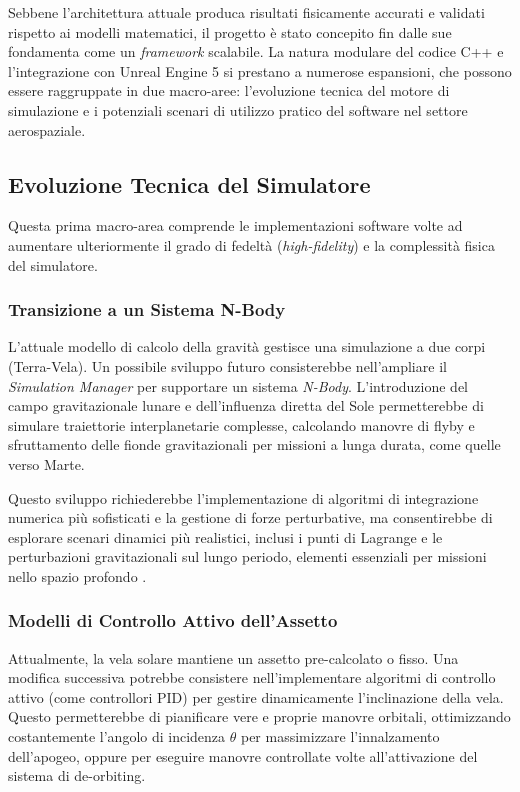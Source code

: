 Sebbene l'architettura attuale produca risultati fisicamente accurati e validati rispetto ai modelli matematici, il progetto è stato concepito fin dalle sue fondamenta come un \textit{framework} scalabile. La natura modulare del codice C++ e l'integrazione con Unreal Engine 5 si prestano a numerose espansioni, che possono essere raggruppate in due macro-aree: l'evoluzione tecnica del motore di simulazione e i potenziali scenari di utilizzo pratico del software nel settore aerospaziale.


\subsection{Evoluzione Tecnica del Simulatore}
Questa prima macro-area comprende le implementazioni software volte ad aumentare ulteriormente il grado di fedeltà (\textit{high-fidelity}) e la complessità fisica del simulatore.

\subsubsection{Transizione a un Sistema N-Body}
L'attuale modello di calcolo della gravità gestisce una simulazione a due corpi (Terra-Vela). Un possibile sviluppo futuro consisterebbe nell'ampliare il \textit{Simulation Manager} per supportare un sistema \textit{N-Body}. L'introduzione del campo gravitazionale lunare e dell'influenza diretta del Sole permetterebbe di simulare traiettorie interplanetarie complesse, calcolando manovre di flyby e sfruttamento delle fionde gravitazionali per missioni a lunga durata, come quelle verso Marte.

Questo sviluppo richiederebbe l'implementazione di algoritmi di integrazione numerica più sofisticati e la gestione di forze perturbative, ma consentirebbe di esplorare scenari dinamici più realistici, inclusi i punti di Lagrange e le perturbazioni gravitazionali sul lungo periodo, elementi essenziali per missioni nello spazio profondo \cite{johnson2008overview, montgomery2017roadmap}.

\subsubsection{Modelli di Controllo Attivo dell'Assetto}
Attualmente, la vela solare mantiene un assetto pre-calcolato o fisso. Una modifica successiva potrebbe consistere nell'implementare algoritmi di controllo attivo (come controllori PID) per gestire dinamicamente l'inclinazione della vela. Questo permetterebbe di pianificare vere e proprie manovre orbitali, ottimizzando costantemente l'angolo di incidenza $\theta$ per massimizzare l'innalzamento dell'apogeo, oppure per eseguire manovre controllate volte all'attivazione del sistema di de-orbiting. 

